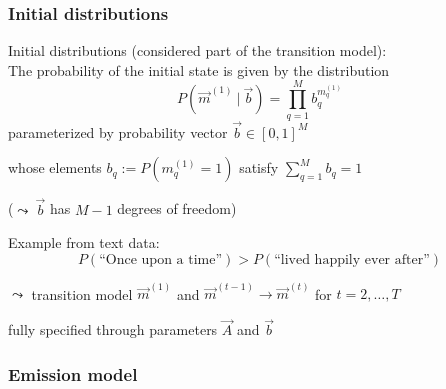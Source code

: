 \subsubsection{Initial distributions}
\label{sec:hmm_init}


\begin{frame}{\subsubsecname}

Initial distributions (considered part of the transition model):\\
The probability of the initial state is given by the distribution
\begin{equation}
P(\vec{m}^{(1)} ~|~ \vec{b}) = \prod_{q=1}^M b_q^{m_q^{(1)}}
\end{equation}
	parameterized by probability vector $\vec{b} \in [0, 1]^M$ 
	
	whose elements $b_q := P(m_q^{(1)} = 1)$ satisfy $\sum_{q=1}^M b_q = 1$

	($\leadsto ~ \vec{b}$ has $M-1$ degrees of freedom)
	
	\pause
	
	Example from text data:\\
	\begin{equation}
		P(\text{``}\text{Once upon a time}\text{''}) > P(\text{``}\text{lived happily ever after}\text{''})
	\end{equation}
	
	\svspace{5mm}
	
	$\leadsto$ transition model $\vec{m}^{(1)}$ and $\vec{m}^{(t-1)} \rightarrow \vec{m}^{(t)}$ for $t=2, \dots, T$
	
	\hspace{5mm} fully specified through parameters $\vec{A}$ and $\vec{b}$

\end{frame}


\subsubsection{Emission model}
\label{sec:hmm_emission}


